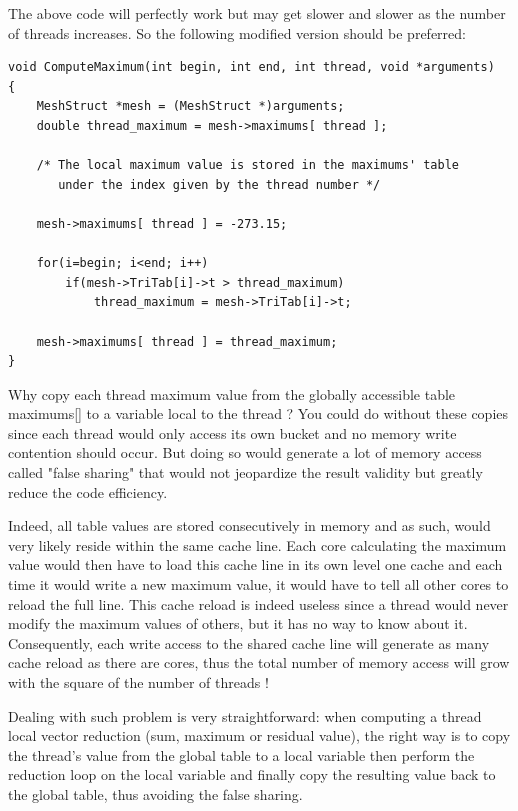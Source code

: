 \documentclass[a4paper,12pt]{article}
\begin{document}
The above code will perfectly work but may get slower and slower as the number of threads increases. So the following modified version should be preferred:

\begin{tt}
\begin{verbatim}
void ComputeMaximum(int begin, int end, int thread, void *arguments)
{
    MeshStruct *mesh = (MeshStruct *)arguments;
    double thread_maximum = mesh->maximums[ thread ];

    /* The local maximum value is stored in the maximums' table
       under the index given by the thread number */

    mesh->maximums[ thread ] = -273.15;

    for(i=begin; i<end; i++)
        if(mesh->TriTab[i]->t > thread_maximum)
            thread_maximum = mesh->TriTab[i]->t;

    mesh->maximums[ thread ] = thread_maximum;
}
\end{verbatim}
\end{tt}
\normalfont

Why copy each thread maximum value from the globally accessible table maximums[] to a variable local to the thread ? You could do without these copies since each thread would only access its own bucket and no memory write contention should occur.
But doing so would generate a lot of memory access called "false sharing" that would not jeopardize the result validity but greatly reduce the code efficiency.

Indeed, all table values are stored consecutively in memory and as such, would very likely reside within the same cache line. Each core calculating the maximum value would then have to load this cache line in its own level one cache and each time it would write a new maximum value, it would have to tell all other cores to reload the full line. This cache reload is indeed useless since a thread would never modify the maximum values of others, but it has no way to know about it. Consequently, each write access to the shared cache line will generate as many cache reload as there are cores, thus the total number of memory access will grow with the square of the number of threads !

Dealing with such problem is very straightforward: when computing a thread local vector reduction (sum, maximum or residual value), the right way is to copy the thread's value from the global table to a local variable then perform the reduction loop on the local variable and finally copy the resulting value back to the global table, thus avoiding the false sharing.
\end{document}
